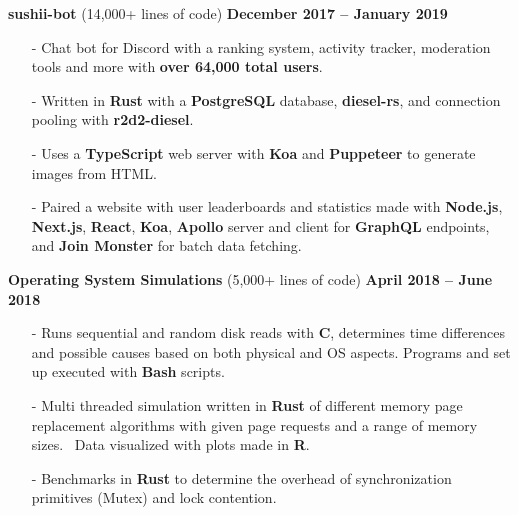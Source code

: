 \documentclass[margin,line]{res}
\begin{document}
\begin{resume}
{\bf sushii-bot} (14,000+ lines of code) \hfill {\bf December 2017 -- January 2019} \\
  \vspace{-3.5mm}
  \begin{itemize} \itemsep -2pt
    \item[-] Chat bot for Discord with a ranking system, activity tracker, moderation tools and more with {\bf over 64,000 total users}.
    \item[-] Written in {\bf Rust} with a {\bf PostgreSQL} database, {\bf diesel-rs}, and connection pooling with {\bf r2d2-diesel}.
    \item[-] Uses a {\bf TypeScript} web server with {\bf Koa} and {\bf Puppeteer} to generate images from HTML.
    \item[-] Paired a website with user leaderboards and statistics made with {\bf Node.js}, {\bf Next.js}, {\bf React}, {\bf Koa}, {\bf Apollo} server and client for {\bf GraphQL} endpoints,
      and {\bf Join Monster} for batch data fetching.
  \end{itemize}
{\bf Operating System Simulations} (5,000+ lines of code) \hfill {\bf April 2018 -- June 2018} \\
  \vspace{-3.5mm}
  \begin{itemize} \itemsep -2pt
    \item[-] Runs sequential and random disk reads with {\bf C}, determines time differences and possible causes based on both physical and OS aspects. 
      Programs and set up executed with {\bf Bash} scripts.
    \item[-] Multi threaded simulation written in {\bf Rust} of different memory page replacement algorithms with given page requests and a range of memory sizes. \
    Data visualized with plots made in {\bf R}.
    \item[-] Benchmarks in {\bf Rust} to determine the overhead of synchronization primitives (Mutex) and lock contention.
  \end{itemize}

\end{resume}
\end{document}
